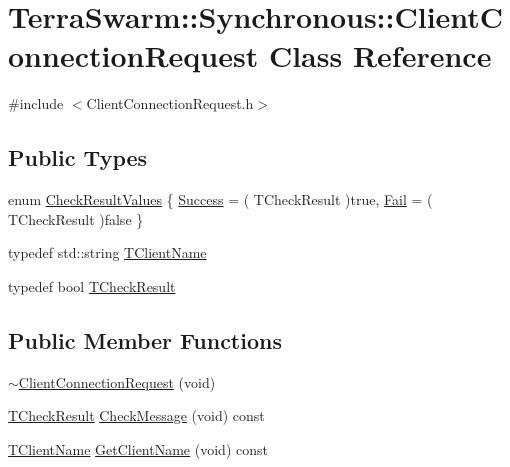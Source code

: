 \hypertarget{class_terra_swarm_1_1_synchronous_1_1_client_connection_request}{\section{Terra\-Swarm\-:\-:Synchronous\-:\-:Client\-Connection\-Request Class Reference}
\label{class_terra_swarm_1_1_synchronous_1_1_client_connection_request}
}


{\ttfamily \#include $<$Client\-Connection\-Request.\-h$>$}

\subsection*{Public Types}
\begin{DoxyCompactItemize}
\item 
enum \hyperlink{class_terra_swarm_1_1_synchronous_1_1_client_connection_request_a784811f86bbc4a1f1232bdbb579db93d}{Check\-Result\-Values} \{ \hyperlink{class_terra_swarm_1_1_synchronous_1_1_client_connection_request_a784811f86bbc4a1f1232bdbb579db93da20fdb875e0dbe807b95684298bac22bc}{Success} = ( T\-Check\-Result )true, 
\hyperlink{class_terra_swarm_1_1_synchronous_1_1_client_connection_request_a784811f86bbc4a1f1232bdbb579db93da78a023654a74eef1adaae15475a5fa3f}{Fail} = ( T\-Check\-Result )false
 \}
\item 
typedef std\-::string \hyperlink{class_terra_swarm_1_1_synchronous_1_1_client_connection_request_a7d85ca6773adf2b3b32cfbff9706f882}{T\-Client\-Name}
\item 
typedef bool \hyperlink{class_terra_swarm_1_1_synchronous_1_1_client_connection_request_af97d7c46396bc29dd8a2628f32a434f2}{T\-Check\-Result}
\end{DoxyCompactItemize}
\subsection*{Public Member Functions}
\begin{DoxyCompactItemize}
\item 
\hyperlink{class_terra_swarm_1_1_synchronous_1_1_client_connection_request_a810bd205bf787cbdbf931501666d2445}{$\sim$\-Client\-Connection\-Request} (void)
\item 
\hyperlink{class_terra_swarm_1_1_synchronous_1_1_client_connection_request_af97d7c46396bc29dd8a2628f32a434f2}{T\-Check\-Result} \hyperlink{class_terra_swarm_1_1_synchronous_1_1_client_connection_request_ac50add84d52e10fcaf148444c09e7145}{Check\-Message} (void) const 
\item 
\hyperlink{class_terra_swarm_1_1_synchronous_1_1_client_connection_request_a7d85ca6773adf2b3b32cfbff9706f882}{T\-Client\-Name} \hyperlink{class_terra_swarm_1_1_synchronous_1_1_client_connection_request_a94838790aca6aa864fd95b85bddfeaeb}{Get\-Client\-Name} (void) const 
\end{DoxyCompactItemize}
